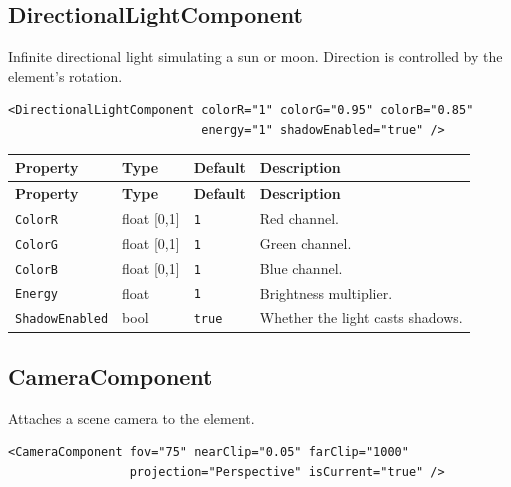 \documentclass[11pt,a4paper]{article}
\begin{document}
\subsection{DirectionalLightComponent}

Infinite directional light simulating a sun or moon. Direction is controlled
by the element's rotation.

\begin{lstlisting}
<DirectionalLightComponent colorR="1" colorG="0.95" colorB="0.85"
                           energy="1" shadowEnabled="true" />
\end{lstlisting}

\begin{longtable}{P{3.5cm} P{2cm} P{2.2cm} P{5.3cm}}
  \toprule
  \textbf{Property} & \textbf{Type} & \textbf{Default} & \textbf{Description} \\
  \midrule
  \endfirsthead
  \toprule
  \textbf{Property} & \textbf{Type} & \textbf{Default} & \textbf{Description} \\
  \midrule
  \endhead
  \texttt{ColorR} & float [0,1] & \texttt{1} & Red channel. \\
  \texttt{ColorG} & float [0,1] & \texttt{1} & Green channel. \\
  \texttt{ColorB} & float [0,1] & \texttt{1} & Blue channel. \\
  \texttt{Energy} & float & \texttt{1} & Brightness multiplier. \\
  \texttt{ShadowEnabled} & bool & \texttt{true} & Whether the light casts shadows. \\
  \bottomrule
\end{longtable}

\subsection{CameraComponent}

Attaches a scene camera to the element.

\begin{lstlisting}
<CameraComponent fov="75" nearClip="0.05" farClip="1000"
                 projection="Perspective" isCurrent="true" />
\end{lstlisting}
\end{document}
